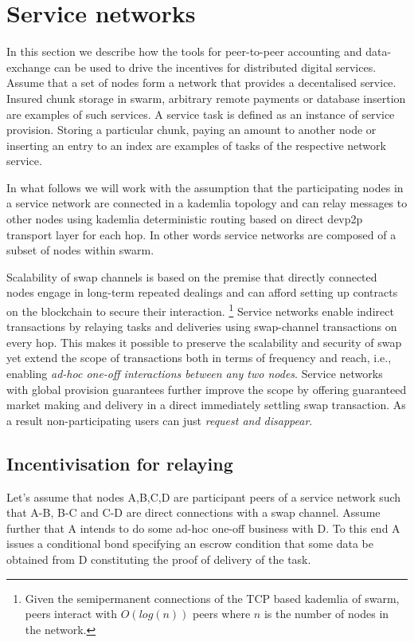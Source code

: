 \documentclass[a4paper,10pt]{article}
\begin{document}
\section{Service networks}

In this section we describe how the tools for peer-to-peer accounting and data-exchange can
be used to drive the incentives for distributed digital services.
Assume that a set of nodes form a network that provides a decentalised service.
Insured chunk storage in swarm, arbitrary remote payments or database insertion are examples of such services.
A \gls{service task} is defined as an instance of service provision. Storing a particular chunk, paying
an amount to another node or inserting an entry to an index are examples of tasks of the respective network
service.

In what follows we will work with the assumption that the participating nodes in a service network are
connected in a kademlia topology and can relay messages to other nodes using kademlia deterministic routing
based on direct devp2p transport layer for each hop. In other words service networks are composed of a subset
of nodes within swarm.

Scalability of
swap channels is based on the premise that directly connected nodes engage in long-term repeated
dealings and can afford setting up contracts on the blockchain to secure their interaction.%
%
\footnote{Given the semipermanent connections of the TCP based kademlia of swarm, peers interact with
$O(log(n))$ peers where $n$ is the number of nodes in the network.}
%
Service networks enable \gls{indirect transactions} by relaying tasks and deliveries using
swap-channel transactions on every hop.
This makes it possible to preserve the scalability and security
of swap yet extend the scope of transactions both in terms of
frequency and reach, i.e., enabling \emph{ad-hoc one-off interactions between any two nodes}.
Service networks with global provision guarantees further improve the scope by
offering guaranteed market making and delivery in a direct immediately settling
swap transaction. As a result non-participating users can just \emph{request and disappear}.

\subsection{Incentivisation for relaying}

Let's assume that nodes A,B,C,D are participant peers of a service network such that
A-B, B-C and C-D are direct connections with a swap channel.
Assume further that A intends to do some ad-hoc one-off business with D. To this end
 A issues a conditional bond specifying an escrow
condition that some data be obtained from D constituting the proof of delivery of the task.
\end{document}
